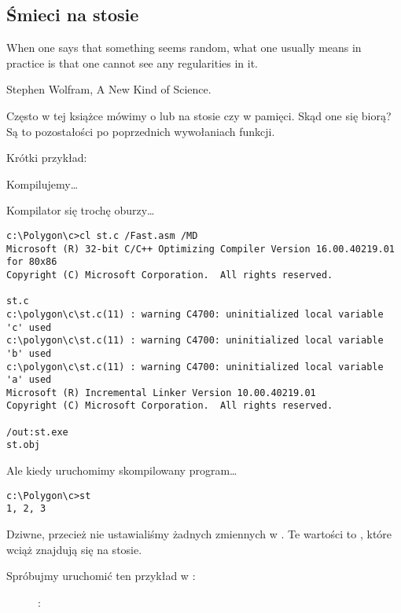 \subsection{Śmieci na stosie}
\label{noise_in_stack}

\epigraph{When one says that something seems random, what one usually
means in practice is that one cannot see any regularities in it.}{Stephen Wolfram, A New Kind of Science.}

Często w tej książce mówimy o  lub  na stosie czy w pamięci.
Skąd one się biorą?
Są to pozostałości po poprzednich wywołaniach funkcji.

Krótki przykład:



Kompilujemy\dots



Kompilator się trochę oburzy\dots

\begin{lstlisting}
c:\Polygon\c>cl st.c /Fast.asm /MD
Microsoft (R) 32-bit C/C++ Optimizing Compiler Version 16.00.40219.01 for 80x86
Copyright (C) Microsoft Corporation.  All rights reserved.

st.c
c:\polygon\c\st.c(11) : warning C4700: uninitialized local variable 'c' used
c:\polygon\c\st.c(11) : warning C4700: uninitialized local variable 'b' used
c:\polygon\c\st.c(11) : warning C4700: uninitialized local variable 'a' used
Microsoft (R) Incremental Linker Version 10.00.40219.01
Copyright (C) Microsoft Corporation.  All rights reserved.

/out:st.exe
st.obj
\end{lstlisting}

Ale kiedy uruchomimy skompilowany program\dots

\begin{lstlisting}
c:\Polygon\c>st
1, 2, 3
\end{lstlisting}

Dziwne, przecież nie ustawialiśmy żadnych zmiennych w . 
Te wartości to , które wciąż znajdują się na stosie.

\clearpage
Spróbujmy uruchomić ten przykład w \olly:

\begin{figure}[H]
\centering
{}
\caption{\olly: }
\label{fig:stack_noise_olly1}
\end{figure}

